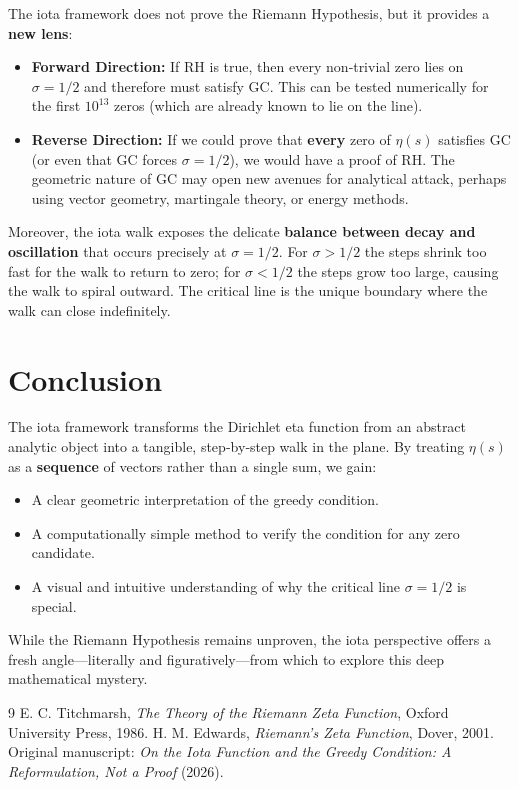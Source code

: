 \documentclass[12pt,a4paper]{article}
\begin{document}
The iota framework does not prove the Riemann Hypothesis, but it provides a \textbf{new lens}:

\begin{itemize}
    \item \textbf{Forward Direction:} If RH is true, then every non‑trivial zero lies on \(\sigma = 1/2\) and therefore must satisfy GC. This can be tested numerically for the first \(10^{13}\) zeros (which are already known to lie on the line).
    \item \textbf{Reverse Direction:} If we could prove that \textbf{every} zero of \(\eta(s)\) satisfies GC (or even that GC forces \(\sigma = 1/2\)), we would have a proof of RH. The geometric nature of GC may open new avenues for analytical attack, perhaps using vector geometry, martingale theory, or energy methods.
\end{itemize}

Moreover, the iota walk exposes the delicate \textbf{balance between decay and oscillation} that occurs precisely at \(\sigma = 1/2\). For \(\sigma > 1/2\) the steps shrink too fast for the walk to return to zero; for \(\sigma < 1/2\) the steps grow too large, causing the walk to spiral outward. The critical line is the unique boundary where the walk can close indefinitely.

\section{Conclusion}

The iota framework transforms the Dirichlet eta function from an abstract analytic object into a tangible, step‑by‑step walk in the plane. By treating \(\eta(s)\) as a \textbf{sequence} of vectors rather than a single sum, we gain:

\begin{itemize}
    \item A clear geometric interpretation of the greedy condition.
    \item A computationally simple method to verify the condition for any zero candidate.
    \item A visual and intuitive understanding of why the critical line \(\sigma = 1/2\) is special.
\end{itemize}

While the Riemann Hypothesis remains unproven, the iota perspective offers a fresh angle---literally and figuratively---from which to explore this deep mathematical mystery.

\begin{thebibliography}{9}
 E. C. Titchmarsh, \textit{The Theory of the Riemann Zeta Function}, Oxford University Press, 1986.
 H. M. Edwards, \textit{Riemann's Zeta Function}, Dover, 2001.
 Original manuscript: \textit{On the Iota Function and the Greedy Condition: A Reformulation, Not a Proof} (2026).
\end{thebibliography}
\end{document}
